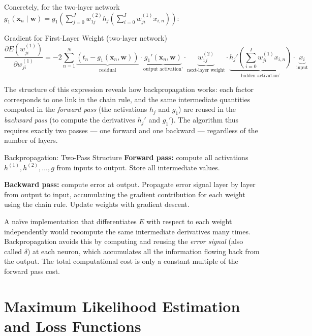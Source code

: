 \documentclass[11pt,a4paper]{article}
\begin{document}
Concretely, for the two-layer network $g_1(\mathbf{x}_n \mid \mathbf{w}) = g_1\!\left(\sum_{j=0}^J w_{1j}^{(2)} h_j\!\left(\sum_{i=0}^I w_{ji}^{(1)} x_{i,n}\right)\right)$:

\begin{thmbox}{Gradient for First-Layer Weight (two-layer network)}
\[
\frac{\partial E(w_{ji}^{(1)})}{\partial w_{ji}^{(1)}} = -2\sum_{n=1}^N
\underbrace{(t_n - g_1(\mathbf{x}_n, \mathbf{w}))}_{\text{residual}} \cdot
\underbrace{g_1'(\mathbf{x}_n, \mathbf{w})}_{\text{output activation'}} \cdot
\underbrace{w_{1j}^{(2)}}_{\text{next-layer weight}} \cdot
\underbrace{h_j'\!\left(\sum_{i=0}^I w_{ji}^{(1)} x_{i,n}\right)}_{\text{hidden activation'}} \cdot
\underbrace{x_i}_{\text{input}}
\]
\end{thmbox}

The structure of this expression reveals how backpropagation works: each factor corresponds to one link in the chain rule, and the same intermediate quantities computed in the \emph{forward pass} (the activations $h_j$ and $g_1$) are reused in the \emph{backward pass} (to compute the derivatives $h_j'$ and $g_1'$). The algorithm thus requires exactly two passes — one forward and one backward — regardless of the number of layers.

\begin{algobox}{Backpropagation: Two-Pass Structure}
\textbf{Forward pass:} compute all activations $h^{(1)}, h^{(2)}, \ldots, g$ from inputs to output. Store all intermediate values.\par\medskip
\textbf{Backward pass:} compute error at output. Propagate error signal layer by layer from output to input, accumulating the gradient contribution for each weight using the chain rule. Update weights with gradient descent.
\end{algobox}

\begin{insightbox}
A naïve implementation that differentiates $E$ with respect to each weight independently would recompute the same intermediate derivatives many times. Backpropagation avoids this by computing and reusing the \emph{error signal} (also called $\delta$) at each neuron, which accumulates all the information flowing back from the output. The total computational cost is only a constant multiple of the forward pass cost.
\end{insightbox}

\section{Maximum Likelihood Estimation and Loss Functions}
\end{document}
